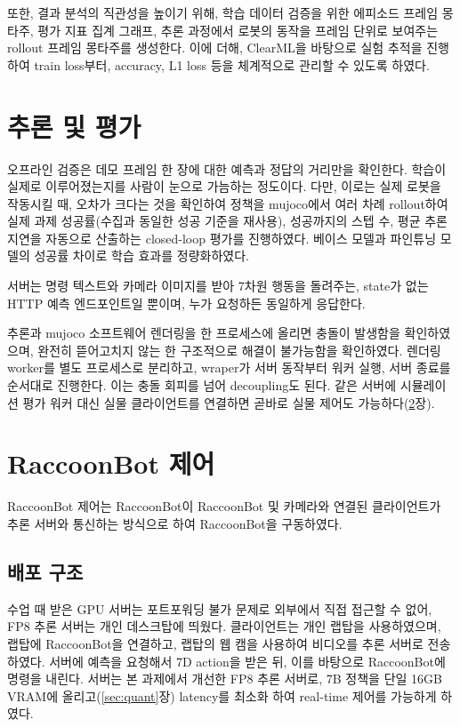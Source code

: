 \documentclass[11pt,a4paper]{article}
\begin{document}
또한, 결과 분석의 직관성을 높이기 위해, 학습 데이터 검증을 위한 에피소드 프레임 몽타주,
평가 지표 집계 그래프, 추론 과정에서 로봇의 동작을 프레임 단위로 보여주는 rollout 프레임 몽타주를 생성한다.
이에 더해, ClearML을 바탕으로 실험 추적을 진행하여 train loss부터, accuracy, L1 loss 등을 체계적으로 관리할 수 있도록 하였다.

\section{추론 및 평가}
\label{sec:server}

오프라인 검증은 데모 프레임 한 장에 대한 예측과 정답의 거리만을 확인한다. 학습이 실제로 이루어졌는지를
사람이 눈으로 가늠하는 정도이다. 다만, 이로는 실제 로봇을 작동시킬 때, 오차가 크다는 것을 확인하여
정책을 mujoco에서 여러 차례 rollout하여 실제 과제 성공률(수집과 동일한 성공 기준을 재사용), 성공까지의 스텝 수,
평균 추론 지연을 자동으로 산출하는 closed-loop 평가를 진행하였다.
베이스 모델과 파인튜닝 모델의 성공률 차이로 학습 효과를 정량화하였다.

서버는 명령 텍스트와 카메라 이미지를 받아 7차원 행동을 돌려주는,
state가 없는 HTTP 예측 엔드포인트일 뿐이며, 누가 요청하든 동일하게 응답한다.

추론과 mujoco 소프트웨어 렌더링을 한 프로세스에 올리면 충돌이 발생함을 확인하였으며,
완전히 뜯어고치지 않는 한 구조적으로 해결이 불가능함을 확인하였다.
렌더링 worker를 별도 프로세스로 분리하고, wraper가 서버 동작부터 워커 실행, 서버 종료를
순서대로 진행한다. 이는 충돌 회피를 넘어 decoupling도 된다. 같은 서버에
시뮬레이션 평가 워커 대신 실물 클라이언트를 연결하면 곧바로 실물 제어도 가능하다(\ref{sec:realrobot}장).

\section{RaccoonBot 제어}
\label{sec:realrobot}

RaccoonBot 제어는 RaccoonBot이 RaccoonBot 및 카메라와 연결된 클라이언트가 추론 서버와 통신하는 방식으로 하여 RaccoonBot을 구동하였다.

\subsection{배포 구조}
\label{subsec:deploy}

수업 때 받은 GPU 서버는 포트포워딩 불가 문제로 외부에서 직접 접근할 수 없어, FP8 추론 서버는 개인 데스크탑에 띄웠다.
클라이언트는 개인 랩탑을 사용하였으며, 랩탑에 RaccoonBot을 연결하고, 랩탑의 웹 캠을 사용하여 비디오를 추론 서버로 전송하였다.
서버에 예측을 요청해서 7D action을 받은 뒤, 이를 바탕으로 RaccoonBot에 명령을 내린다.
서버는 본 과제에서 개선한 FP8 추론 서버로, 7B 정책을 단일 16GB VRAM에 올리고(\ref{sec:quant}장)
latency를 최소화 하여 real-time 제어를 가능하게 하였다.
\end{document}
